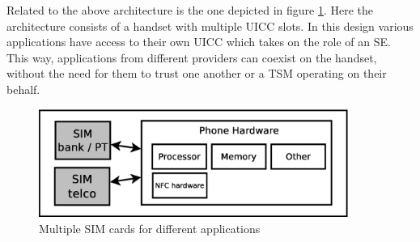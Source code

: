 \begin{enumerate}
\begin{item}
Related to the above architecture is the one depicted in figure \ref{fig:multi_sim}.
Here the architecture consists of a handset with multiple UICC slots.
In this design various applications have access to their own UICC which takes on the role of an SE.
This way, applications from different providers can coexist on the handset, without the need for them to trust one another or a TSM operating on their behalf. %
\begin{figure}
\includegraphics[width=0.9\textwidth]{images/meerdere_sims}
\caption[Multiple SIM cards]
{
Multiple SIM cards for different applications
}
\label{fig:multi_sim}
\end{figure}
\end{item}


\end{enumerate}

